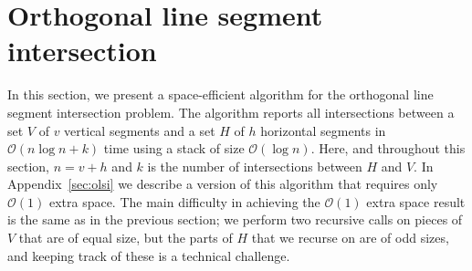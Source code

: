 \documentclass{elsart}
\newcommand{\Oh}[1]{\ensuremath{\mathcal{O}(#1)}}
\begin{document}
%
%
%
%


\section{Orthogonal line segment intersection}\label{sec:orth}

In this section, we present a space-efficient algorithm for the
orthogonal line segment intersection problem.  The algorithm reports
all intersections between a set $V$ of $v$ vertical segments and a set
$H$ of $h$ horizontal segments in $\Oh{n\log n + k}$ time using a
stack of size $\Oh{\log n}$.  Here, and throughout this section,
$n=v+h$ and $k$ is the number of intersections between $H$ and $V$.
In Appendix~\ref{sec:olsi} we describe a version of this algorithm
that requires only $\Oh{1}$ extra space.  The main difficulty in
achieving the $\Oh{1}$ extra space result is the same as in the
previous section; we perform two recursive calls on pieces of $V$ that
are of equal size, but the parts of $H$ that we recurse on are of odd
sizes, and keeping track of these is a technical challenge.
\end{document}
